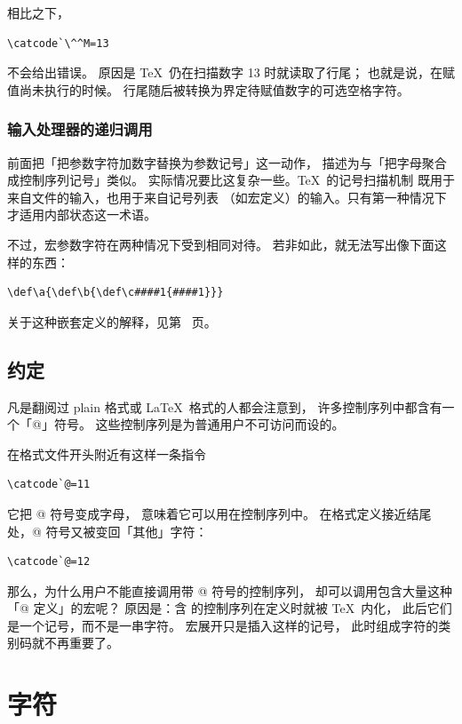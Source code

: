 \documentclass[a4paper]{rapport3}
\begin{document}
相比之下，
\begin{verbatim}
\catcode`\^^M=13
\end{verbatim}
不会给出错误。
原因是 \TeX\ 仍在扫描数字 13 时就读取了行尾；
也就是说，在赋值尚未执行的时候。
行尾随后被转换为界定待赋值数字的可选空格字符。

\subsection{输入处理器的递归调用}

前面把「把参数字符加数字替换为参数记号」这一动作，
描述为与「把字母聚合成控制序列记号」类似。
实际情况要比这复杂一些。\TeX\ 的记号扫描机制
既用于来自文件的输入，也用于来自记号列表
（如宏定义）的输入。只有第一种情况下
才适用内部状态这一术语。

不过，宏参数字符在两种情况下受到相同对待。
若非如此，就无法写出像下面这样的东西：
\begin{verbatim}
\def\a{\def\b{\def\c####1{####1}}}
\end{verbatim}
关于这种嵌套定义的解释，见第~\pageref{nest:def} 页。

\section{ 约定}

凡是翻阅过 plain 格式或 \LaTeX\ 格式的人都会注意到，
许多控制序列中都含有一个「@」符号。
这些控制序列是为普通用户不可访问而设的。

在格式文件开头附近有这样一条指令
\begin{verbatim}
\catcode`@=11
\end{verbatim}
它把 @ 符号变成字母，
意味着它可以用在控制序列中。
在格式定义接近结尾处，@ 符号又被变回「其他」字符：
\begin{verbatim}
\catcode`@=12
\end{verbatim}

那么，为什么用户不能直接调用带 @ 符号的控制序列，
却可以调用包含大量这种「@ 定义」的宏呢？
原因是：含 \n@ 的控制序列在定义时就被 \TeX\ 内化，
此后它们是一个记号，而不是一串字符。
宏展开只是插入这样的记号，
此时组成字符的类别码就不再重要了。


\endofchapter
\chapter{字符}\label{char}
\end{document}
